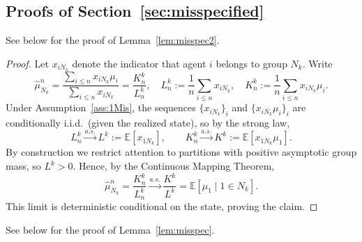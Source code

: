 \documentclass[12pt,reqno]{amsart}
\begin{document}
\subsection{Proofs of Section~\ref{sec:misspecified}}
See below for the proof of Lemma~\ref{lem:misspec2}.
\begin{proof}
Let $x_{iN_k}$ denote the indicator that agent $i$ belongs to group $N_k$. Write
\[
\hat{\mu}_{N_k}^n=\frac{\sum_{i\le n}x_{iN_k}\mu_i}{\sum_{i\le n}x_{iN_k}}
=\frac{K_n^k}{L_n^k},
\quad
L_n^k:=\frac1n\sum_{i\le n}x_{iN_k},
\quad
K_n^k:=\frac1n\sum_{i\le n}x_{iN_k}\mu_i.
\]
Under Assumption~\ref{ass:1Mis}, the sequences $\{x_{iN_k}\}_i$ and $\{x_{iN_k}\mu_i\}_i$ are conditionally i.i.d.\ (given the realized state), so by the strong law,
\[
L_n^k \xrightarrow{a.s.} L^k:=\mathbb{E}[x_{1N_k}],
\qquad
K_n^k \xrightarrow{a.s.} K^k:=\mathbb{E}[x_{1N_k}\mu_1].
\]
By construction we restrict attention to partitions with positive asymptotic group mass, so $L^k>0$. Hence, by the Continuous Mapping Theorem,
\[
\hat{\mu}_{N_k}^n=\frac{K_n^k}{L_n^k}\xrightarrow{a.s.}\frac{K^k}{L^k}
=\mathbb{E}\!\left[\mu_1\mid 1\in N_k\right].
\]
This limit is deterministic conditional on the state, proving the claim.
\end{proof}
See below for the proof of Lemma~\ref{lem:misspec}.
\end{document}
